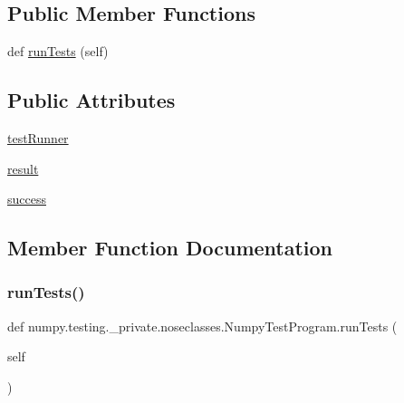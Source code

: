 \subsection*{Public Member Functions}
\begin{DoxyCompactItemize}
\item 
def \hyperlink{classnumpy_1_1testing_1_1__private_1_1noseclasses_1_1NumpyTestProgram_a7adcf3c6923bc4197cfc89c239a43388}{run\+Tests} (self)
\end{DoxyCompactItemize}
\subsection*{Public Attributes}
\begin{DoxyCompactItemize}
\item 
\hyperlink{classnumpy_1_1testing_1_1__private_1_1noseclasses_1_1NumpyTestProgram_a0ca13322a4546e051d7120cf9367a7d0}{test\+Runner}
\item 
\hyperlink{classnumpy_1_1testing_1_1__private_1_1noseclasses_1_1NumpyTestProgram_a42836966ad6ca301f97c70ad7ea1398e}{result}
\item 
\hyperlink{classnumpy_1_1testing_1_1__private_1_1noseclasses_1_1NumpyTestProgram_adaa4adbabc8cbc10ec283e03265be7b4}{success}
\end{DoxyCompactItemize}


\subsection{Member Function Documentation}
\mbox{\label{classnumpy_1_1testing_1_1__private_1_1noseclasses_1_1NumpyTestProgram_a7adcf3c6923bc4197cfc89c239a43388}} 
\subsubsection{\texorpdfstring{run\+Tests()}{runTests()}}
{\footnotesize\ttfamily def numpy.\+testing.\+\_\+private.\+noseclasses.\+Numpy\+Test\+Program.\+run\+Tests (\begin{DoxyParamCaption}\item[{}]{self }\end{DoxyParamCaption})}

